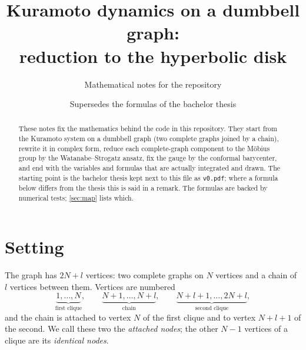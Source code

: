 \documentclass[a4paper,11pt]{article}
\title{Kuramoto dynamics on a dumbbell graph:\\ reduction to the hyperbolic disk}
\author{Mathematical notes for the \code{kuramoto-visuals} repository}
\date{Supersedes the formulas of the bachelor thesis \code{v0.pdf}}
\newcommand{\code}[1]{\texttt{#1}}
\theoremstyle{remark}
\begin{document}
\maketitle

\begin{abstract}
These notes fix the mathematics behind the code in this repository. They start
from the Kuramoto system on a dumbbell graph (two complete graphs joined by a
chain), rewrite it in complex form, reduce each complete-graph component to the
M\"obius group by the Watanabe--Strogatz ansatz, fix the gauge by the conformal
barycenter, and end with the variables and formulas that are actually
integrated and drawn. The starting point is the bachelor thesis kept next to
this file as \code{v0.pdf}; where a formula below differs from the thesis this
is said in a remark. The formulas are backed by numerical tests;
\cref{sec:map} lists which.
\end{abstract}

\tableofcontents

\section{Setting}\label{sec:setting}

The graph has $2N+l$ vertices: two complete graphs on $N$ vertices and a chain
of $l$ vertices between them. Vertices are numbered
\[
\underbrace{1,\dots,N}_{\text{first clique}},\qquad
\underbrace{N+1,\dots,N+l}_{\text{chain}},\qquad
\underbrace{N+l+1,\dots,2N+l}_{\text{second clique}},
\]
and the chain is attached to vertex $N$ of the first clique and to vertex
$N+l+1$ of the second. We call these two the \emph{attached nodes}; the other
$N-1$ vertices of a clique are its \emph{identical nodes}.
\end{document}
